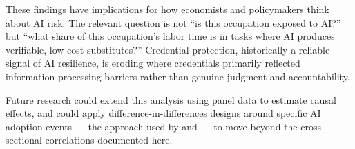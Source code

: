 \documentclass[12pt]{article}
\begin{document}
These findings have implications for how economists and policymakers 
think about AI risk. The relevant question is not ``is this occupation 
exposed to AI?'' but ``what share of this occupation's labor time is 
in tasks where AI produces verifiable, low-cost substitutes?'' 
Credential protection, historically a reliable signal of AI 
resilience, is eroding where credentials primarily reflected 
information-processing barriers rather than genuine judgment and 
accountability.

Future research could extend this analysis using panel data to 
estimate causal effects, and could apply difference-in-differences 
designs around specific AI adoption events --- the approach used 
by \citet{fedyk2022} and \citet{crane2026} --- to move beyond the 
cross-sectional correlations documented here.



\end{document}
